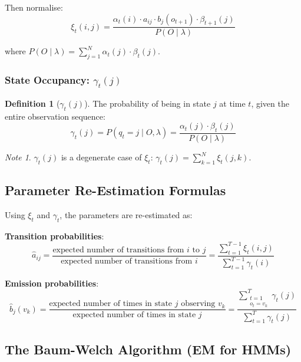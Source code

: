 \documentclass[11pt,a4paper]{article}
\theoremstyle{definition}
\newtheorem{definition}{Definition}[section]
\theoremstyle{plain}
\theoremstyle{remark}
\newtheorem*{remark}{Note}
\begin{document}
Then normalise:
\[
\xi_t(i,j) = \frac{\alpha_t(i) \cdot a_{ij} \cdot b_j(o_{t+1}) \cdot \beta_{t+1}(j)}{P(O \mid \lambda)}
\]

where $P(O \mid \lambda) = \sum_{j=1}^{N} \alpha_t(j) \cdot \beta_t(j)$.

\subsubsection{State Occupancy: $\gamma_t(j)$}

\begin{definition}[$\gamma_t(j)$]
The probability of being in state $j$ at time $t$, given the entire observation sequence:
\[
\gamma_t(j) = P(q_t = j \mid O, \lambda) = \frac{\alpha_t(j) \cdot \beta_t(j)}{P(O \mid \lambda)}
\]
\end{definition}

\begin{remark}
$\gamma_t(j)$ is a degenerate case of $\xi_t$: $\gamma_t(j) = \sum_{k=1}^{N} \xi_t(j, k)$.
\end{remark}

\subsection{Parameter Re-Estimation Formulas}

Using $\xi_t$ and $\gamma_t$, the parameters are re-estimated as:

\begin{tcolorbox}[colback=yellow!10!white,colframe=orange!75!black,title=\textbf{Baum-Welch Re-Estimation}]
\textbf{Transition probabilities}:
\[
\hat{a}_{ij} = \frac{\text{expected number of transitions from } i \text{ to } j}{\text{expected number of transitions from } i} = \frac{\displaystyle\sum_{t=1}^{T-1} \xi_t(i,j)}{\displaystyle\sum_{t=1}^{T-1} \gamma_t(i)}
\]

\textbf{Emission probabilities}:
\[
\hat{b}_j(v_k) = \frac{\text{expected number of times in state } j \text{ observing } v_k}{\text{expected number of times in state } j} = \frac{\displaystyle\sum_{\substack{t=1 \\ o_t = v_k}}^{T} \gamma_t(j)}{\displaystyle\sum_{t=1}^{T} \gamma_t(j)}
\]
\end{tcolorbox}

\subsection{The Baum-Welch Algorithm (EM for HMMs)}
\end{document}
